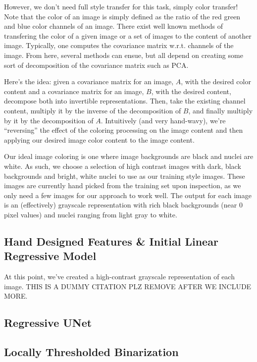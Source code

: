 \documentclass[paper=letter, fontsize=12pt]{article}
\numberwithin{equation}{section} %
\numberwithin{figure}{section} %
\numberwithin{table}{section} %
\begin{document}
However, we don't need full style transfer for this task, simply color
transfer! Note that the color of an image is simply defined as the ratio of the
red green and blue color channels of an image. There exist well known methods
of transfering the color of a given image or a set of images to the content of
another image.  Typically, one computes the covariance matrix w.r.t. channels
of the image.  From here, several methods can ensue, but all depend on creating
some sort of decomposition of the covariance matrix such as PCA.

Here's the idea: given a covariance matrix for an image, $A$, with the desired
color content and a covariance matrix for an image, $B$, with the desired
content, decompose both into invertible representations. Then, take the
existing channel content, multiply it by the inverse of the decomposition of
$B$, and finally multiply by it by the decomposition of $A$. Intuitively (and
very hand-wavy), we're ``reversing'' the effect of the coloring processing on
the image content and then applying our desired image color content to the
image content.

Our ideal image coloring is one where image backgrounds are black and nuclei
are white.  As such, we choose a selection of high contrast images with dark,
black backgrounds and bright, white nuclei to use as our training style images.
These images are currently hand picked from the training set upon inspection,
as we only need a few images for our approach to work well.  The output for
each image is an (effectively) grayscale representation with rich black
backgrounds (near 0 pixel values) and nuclei ranging from light gray to white.

\subsection{Hand Designed Features \& Initial Linear Regressive Model}

At this point, we've created a high-contrast grayscale representation of each
image. THIS IS A DUMMY CITATION PLZ REMOVE AFTER WE INCLUDE MORE.
\cite{DUMMY:1}

\subsection{Regressive UNet}

\subsection{Locally Thresholded Binarization}
\end{document}
